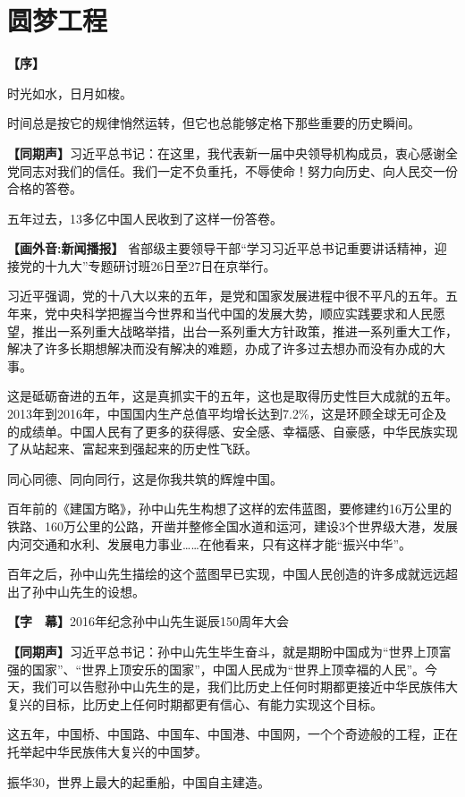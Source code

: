 \documentclass{ctexart}
\newcommand{\zkh}[1]{\textbf{\hspace{-2.7em} 【#1】}}
\begin{document}
\part{圆梦工程}

\zkh{序}

 时光如水，日月如梭。

 时间总是按它的规律悄然运转，但它也总能够定格下那些重要的历史瞬间。

\zkh{同期声}习近平总书记：在这里，我代表新一届中央领导机构成员，衷心感谢全党同志对我们的信任。我们一定不负重托，不辱使命！努力向历史、向人民交一份合格的答卷。

 五年过去，13多亿中国人民收到了这样一份答卷。

 \zkh{画外音:新闻播报} 
省部级主要领导干部``学习习近平总书记重要讲话精神，迎接党的十九大''专题研讨班26日至27日在京举行。

习近平强调，党的十八大以来的五年，是党和国家发展进程中很不平凡的五年。五年来，党中央科学把握当今世界和当代中国的发展大势，顺应实践要求和人民愿望，推出一系列重大战略举措，出台一系列重大方针政策，推进一系列重大工作，解决了许多长期想解决而没有解决的难题，办成了许多过去想办而没有办成的大事。

这是砥砺奋进的五年，这是真抓实干的五年，这也是取得历史性巨大成就的五年。2013年到2016年，中国国内生产总值平均增长达到7.2{\%}，这是环顾全球无可企及的成绩单。中国人民有了更多的获得感、安全感、幸福感、自豪感，中华民族实现了从站起来、富起来到强起来的历史性飞跃。

 同心同德、同向同行，这是你我共筑的辉煌中国。
 
百年前的《建国方略》，孙中山先生构想了这样的宏伟蓝图，要修建约16万公里的铁路、160万公里的公路，开凿并整修全国水道和运河，建设3个世界级大港，发展内河交通和水利、发展电力事业{\ldots}{\ldots}在他看来，只有这样才能``振兴中华''。

百年之后，孙中山先生描绘的这个蓝图早已实现，中国人民创造的许多成就远远超出了孙中山先生的设想。

 \zkh{字　幕}2016年纪念孙中山先生诞辰150周年大会

 \zkh{同期声}习近平总书记：孙中山先生毕生奋斗，就是期盼中国成为``世界上顶富强的国家''、``世界上顶安乐的国家''，中国人民成为``世界上顶幸福的人民''。今天，我们可以告慰孙中山先生的是，我们比历史上任何时期都更接近中华民族伟大复兴的目标，比历史上任何时期都更有信心、有能力实现这个目标。

这五年，中国桥、中国路、中国车、中国港、中国网，一个个奇迹般的工程，正在托举起中华民族伟大复兴的中国梦。

振华30，世界上最大的起重船，中国自主建造。
\end{document}
